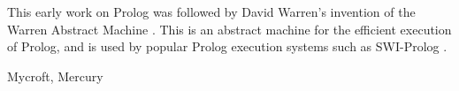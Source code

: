 \documentclass[12pt,a4paper]{report}
\begin{document}
 This early work on Prolog was followed by David Warren's invention of the Warren Abstract Machine \cite{WAM}. This is an abstract machine for the efficient execution of Prolog, and is used by popular Prolog execution systems such as SWI-Prolog \cite{REFswi}.



Mycroft, Mercury














\end{document}
